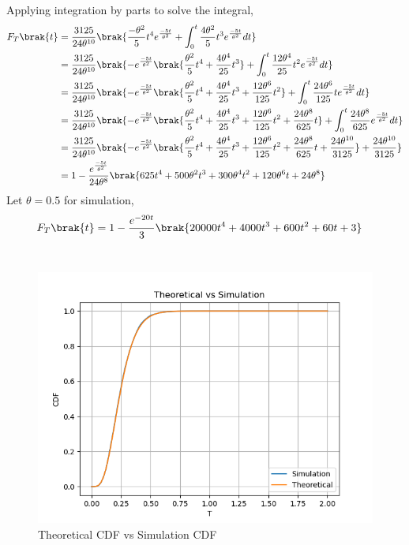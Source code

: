 \documentclass[journal,12pt,onecolumn]{IEEEtran}
\theoremstyle{remark}
\begin{document}
Applying integration by parts to solve the integral,
\begin{align}
	F_T\brak{t} &= \frac{3125}{24\theta^{10}}\brak{\frac{-\theta^2}{5}t^4e^{\frac{-5t}{\theta^2}} + \int^t_0{\frac{4\theta^2}{5}t^3e^{\frac{-5t}{\theta^2}}dt}}\\
	&= \frac{3125}{24\theta^{10}}\brak{-e^{\frac{-5t}{\theta^2}}\brak{\frac{\theta^2}{5}t^4 + \frac{4\theta^4}{25}t^3} + \int^t_0{\frac{12\theta^4}{25}t^2e^{\frac{-5t}{\theta^2}}dt}}\\
	&= \frac{3125}{24\theta^{10}}\brak{-e^{\frac{-5t}{\theta^2}}\brak{\frac{\theta^2}{5}t^4 + \frac{4\theta^4}{25}t^3 + \frac{12\theta^6}{125}t^2}+\int^t_0{\frac{24\theta^6}{125}te^{\frac{-5t}{\theta^2}}dt}}\\
	&= \frac{3125}{24\theta^{10}}\brak{-e^{\frac{-5t}{\theta^2}}\brak{\frac{\theta^2}{5}t^4 + \frac{4\theta^4}{25}t^3 + \frac{12\theta^6}{125}t^2 + \frac{24\theta^8}{625}t} + \int^t_0{\frac{24\theta^8}{625}e^{\frac{-5t}{\theta^2}}dt}}\\
	&= \frac{3125}{24\theta^{10}}\brak{-e^{\frac{-5t}{\theta^2}}\brak{\frac{\theta^2}{5}t^4 + \frac{4\theta^4}{25}t^3 + \frac{12\theta^6}{125}t^2 + \frac{24\theta^8}{625}t + \frac{24\theta^{10}}{3125}} + \frac{24\theta^{10}}{3125}}\\
	&= 1 - \frac{e^{\frac{-5t}{\theta^2}}}{24\theta^8}\brak{625t^4 + 500\theta^2t^3 + 300\theta^4t^2 + 120\theta^6t + 24\theta^8}
\end{align}
Let $\theta = 0.5$ for simulation,
\begin{align}
	F_T\brak{t} &= 1 - \frac{e^{-20t}}{3}\brak{20000t^4 + 4000t^3 + 600t^2 + 60t + 3}
\end{align}
\\
\begin{figure}[!ht]
	\centering
	\includegraphics[width = \columnwidth]{./figs/cdf.png}
	\caption{Theoretical CDF vs Simulation CDF}
\end{figure}
\end{document}

